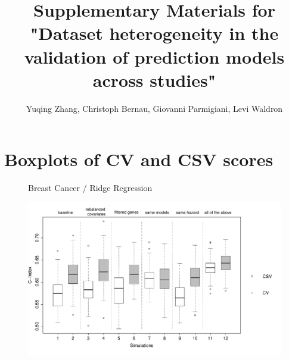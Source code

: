 \documentclass{article}
\title{Supplementary Materials for "Dataset heterogeneity in the validation of prediction models across studies"}
\author{Yuqing Zhang, Christoph Bernau, Giovanni Parmigiani, Levi Waldron}
\date{}
\begin{document}
\maketitle
\tableofcontents
\newpage

%


\section{Boxplots of CV and CSV scores}

  \begin{figure}[H]
		\centering            
        	\centerline{Breast Cancer / Ridge Regression}
            \includegraphics[width=16cm]{boxplot_breast_ridge_withnames.pdf}
   \end{figure}
   
\end{document}
